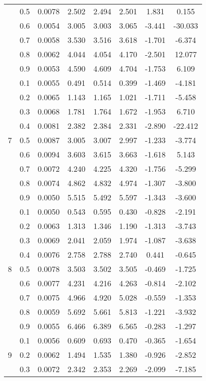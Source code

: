 \documentclass[11pt,a4paper]{report}
\begin{document}
\begin{longtable}{ | c | c || c | c | c | c | c | c | }
 & 0.5 & 0.0078 & 2.502 & 2.494 & 2.501 & 1.831 & 0.155 \\
 & 0.6 & 0.0054 & 3.005 & 3.003 & 3.065 & -3.441 & -30.033 \\
 & 0.7 & 0.0058 & 3.530 & 3.516 & 3.618 & -1.701 & -6.374 \\
 & 0.8 & 0.0062 & 4.044 & 4.054 & 4.170 & -2.501 & 12.077 \\
 & 0.9 & 0.0053 & 4.590 & 4.609 & 4.704 & -1.753 & 6.109 \\
 \hline
\multirow{9}{*}{7} & 0.1 & 0.0055 & 0.491 & 0.514 & 0.399 & -1.469 & -4.181 \\
 & 0.2 & 0.0065 & 1.143 & 1.165 & 1.021 & -1.711 & -5.458 \\
 & 0.3 & 0.0068 & 1.781 & 1.764 & 1.672 & -1.953 & 6.710 \\
 & 0.4 & 0.0081 & 2.382 & 2.384 & 2.331 & -2.890 & -22.412 \\
 & 0.5 & 0.0087 & 3.005 & 3.007 & 2.997 & -1.233 & -3.774 \\
 & 0.6 & 0.0094 & 3.603 & 3.615 & 3.663 & -1.618 & 5.143 \\
 & 0.7 & 0.0072 & 4.240 & 4.225 & 4.320 & -1.756 & -5.299 \\
 & 0.8 & 0.0074 & 4.862 & 4.832 & 4.974 & -1.307 & -3.800 \\
 & 0.9 & 0.0050 & 5.515 & 5.492 & 5.597 & -1.343 & -3.600 \\
 \hline
\multirow{9}{*}{8} & 0.1 & 0.0050 & 0.543 & 0.595 & 0.430 & -0.828 & -2.191 \\
 & 0.2 & 0.0063 & 1.313 & 1.346 & 1.190 & -1.313 & -3.743 \\
 & 0.3 & 0.0069 & 2.041 & 2.059 & 1.974 & -1.087 & -3.638 \\
 & 0.4 & 0.0076 & 2.758 & 2.788 & 2.740 & 0.441 & -0.645 \\
 & 0.5 & 0.0078 & 3.503 & 3.502 & 3.505 & -0.469 & -1.725 \\
 & 0.6 & 0.0077 & 4.231 & 4.216 & 4.263 & -0.814 & -2.102 \\
 & 0.7 & 0.0075 & 4.966 & 4.920 & 5.028 & -0.559 & -1.353 \\
 & 0.8 & 0.0059 & 5.692 & 5.661 & 5.813 & -1.221 & -3.932 \\
 & 0.9 & 0.0055 & 6.466 & 6.389 & 6.565 & -0.283 & -1.297 \\
 \hline
\multirow{9}{*}{9} & 0.1 & 0.0056 & 0.609 & 0.693 & 0.470 & -0.365 & -1.654 \\
 & 0.2 & 0.0062 & 1.494 & 1.535 & 1.380 & -0.926 & -2.852 \\
 & 0.3 & 0.0072 & 2.342 & 2.353 & 2.269 & -2.099 & -7.185 \\

\end{longtable}
\end{document}
